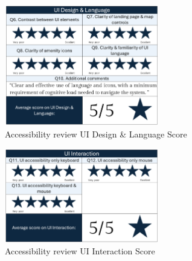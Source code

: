 \begin{figure}[h!]
    \centering
    \includegraphics[width=0.6\textwidth]{images/accessb-survey-design.png}
    \caption{Accessibility review \- UI Design \& Language Score}
    \label{fig:accessbdesignscore}
\end{figure}

\begin{figure}[h!]
    \centering
    \includegraphics[width=0.6\textwidth]{images/accessb-survey-interaction.png}
    \caption{Accessibility review \- UI Interaction Score}
    \label{fig:accessbinteractionscore}
\end{figure}

\newpage{}